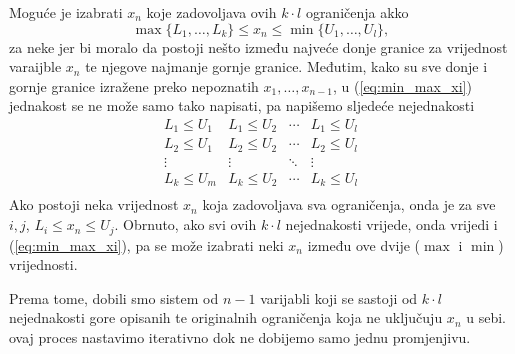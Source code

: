 \documentclass[a4paper, utf8, 11pt, colorlinks]{article}
\begin{document}
 Moguće je izabrati $x_n$ koje zadovoljava ovih $k \cdot l$ ograničenja akko 
 \begin{equation}\label{eq:min_max_xi}
     \max\{L_1,\ldots, L_k \} \leq x_n \leq \min \{ U_1, \ldots, U_l \},
   \end{equation}
za neke 
 jer bi moralo da postoji nešto između najveće donje granice za vrijednost varaijble $x_n$ te njegove najmanje gornje granice. Međutim, kako su sve donje i gornje granice izražene preko nepoznatih $x_1, \ldots, x_{n-1}$,  u (\ref{eq:min_max_xi}) jednakost se ne može samo tako napisati, pa napišemo sljedeće nejednakosti 
 $$\begin{array}{cccc}
       L_1 \leq U_1 & L_1 \leq U_2   &  \cdots   & L_1 \leq U_l \\
       L_2 \leq U_1 & L_2  \leq U_2  &  \cdots   & L_2 \leq U_l \\
       \vdots       &     \vdots     &   \ddots  & \vdots       \\
       L_k \leq U_m &  L_k \leq U_2  &   \cdots  & L_k \leq U_l \\
 \end{array}$$ 
Ako postoji neka vrijednost  $x_n$ koja zadovoljava sva ograničenja, onda je za sve $i,j$, 
$L_i \leq x_n \leq U_j$. Obrnuto, ako svi ovih $k \cdot l$ nejednakosti vrijede, onda vrijedi i (\ref{eq:min_max_xi}), pa se može izabrati neki $x_n$ između ove dvije ($\max$ i $\min$) vrijednosti. 

Prema tome, dobili smo sistem od $n-1$ varijabli koji se sastoji od  $k \cdot l$ nejednakosti gore opisanih te originalnih ograničenja koja ne uključuju $x_n$ u sebi. ovaj proces nastavimo iterativno dok ne dobijemo samo jednu promjenjivu. 
\end{document}
